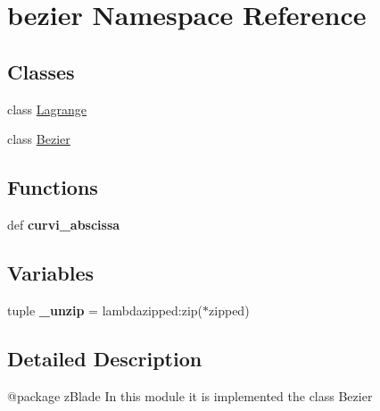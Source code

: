 \hypertarget{namespacebezier}{\section{bezier \-Namespace \-Reference}
\label{namespacebezier}
}
\subsection*{\-Classes}
\begin{DoxyCompactItemize}
\item 
class \hyperlink{classbezier_1_1Lagrange}{\-Lagrange}
\item 
class \hyperlink{classbezier_1_1Bezier}{\-Bezier}
\end{DoxyCompactItemize}
\subsection*{\-Functions}
\begin{DoxyCompactItemize}
\item 
\hypertarget{namespacebezier_a584071379a6043563ba0b60ec8ead8eb}{def {\bfseries curvi\-\_\-abscissa}}\label{namespacebezier_a584071379a6043563ba0b60ec8ead8eb}

\end{DoxyCompactItemize}
\subsection*{\-Variables}
\begin{DoxyCompactItemize}
\item 
\hypertarget{namespacebezier_a35f64e1d41bd0a538b9a3a7640fffcc1}{tuple {\bfseries \-\_\-unzip} = lambdazipped\-:zip($\ast$zipped)}\label{namespacebezier_a35f64e1d41bd0a538b9a3a7640fffcc1}

\end{DoxyCompactItemize}


\subsection{\-Detailed \-Description}
\begin{DoxyVerb}@package zBlade
In this module it is implemented the class Bezier   
\end{DoxyVerb}
 